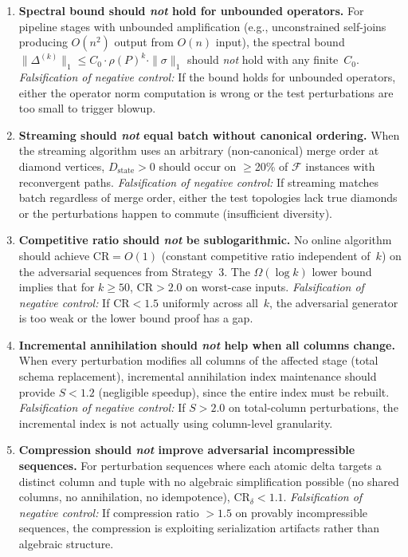 \documentclass[11pt,a4paper]{article}
\theoremstyle{definition}
\newcommand{\FragF}{\mathcal{F}}
\begin{document}
\begin{enumerate}[label=\textbf{NC\arabic*},nosep,start=11]
  \item \textbf{Spectral bound should \emph{not} hold for unbounded operators.}
    For pipeline stages with unbounded amplification (e.g., unconstrained
    self-joins producing $O(n^2)$ output from $O(n)$ input), the spectral
    bound $\|\Delta^{(k)}\|_1 \leq C_0 \cdot \rho(P)^k \cdot \|\sigma\|_1$
    should \emph{not} hold with any finite~$C_0$.
    \emph{Falsification of negative control:}  If the bound holds for
    unbounded operators, either the operator norm computation is wrong or the
    test perturbations are too small to trigger blowup.

  \item \textbf{Streaming should \emph{not} equal batch without canonical
    ordering.}
    When the streaming algorithm uses an arbitrary (non-canonical) merge order
    at diamond vertices, $D_{\mathrm{state}} > 0$ should occur on $\geq$20\%
    of $\FragF$ instances with reconvergent paths.
    \emph{Falsification of negative control:}  If streaming matches batch
    regardless of merge order, either the test topologies lack true diamonds
    or the perturbations happen to commute (insufficient diversity).

  \item \textbf{Competitive ratio should \emph{not} be sublogarithmic.}
    No online algorithm should achieve $\mathrm{CR} = O(1)$ (constant
    competitive ratio independent of~$k$) on the adversarial sequences
    from Strategy~3.  The $\Omega(\log k)$ lower bound implies that for
    $k \geq 50$, $\mathrm{CR} > 2.0$ on worst-case inputs.
    \emph{Falsification of negative control:}  If $\mathrm{CR} < 1.5$
    uniformly across all~$k$, the adversarial generator is too weak or the
    lower bound proof has a gap.

  \item \textbf{Incremental annihilation should \emph{not} help when all
    columns change.}
    When every perturbation modifies all columns of the affected stage
    (total schema replacement), incremental annihilation index maintenance
    should provide $S < 1.2$ (negligible speedup), since the entire index
    must be rebuilt.
    \emph{Falsification of negative control:}  If $S > 2.0$ on total-column
    perturbations, the incremental index is not actually using column-level
    granularity.

  \item \textbf{Compression should \emph{not} improve adversarial
    incompressible sequences.}
    For perturbation sequences where each atomic delta targets a distinct
    column and tuple with no algebraic simplification possible (no shared
    columns, no annihilation, no idempotence), $\mathrm{CR}_\delta < 1.1$.
    \emph{Falsification of negative control:}  If compression ratio $> 1.5$
    on provably incompressible sequences, the compression is exploiting
    serialization artifacts rather than algebraic structure.


\end{enumerate}
\end{document}
